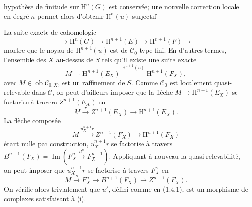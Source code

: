 \documentclass[11pt]{article}
\newcommand{\RRR}{\mathrm{RRR}}
\providecommand{\cC}{\mathcal C}
\providecommand{\Coker}{\operatorname{Coker}}
\providecommand{\Ker}{\operatorname{Ker}}
\providecommand{\cO}{\mathcal O}
\begin{document}
\providecommand{\cS}{\mathcal S}
\providecommand{\cD}{\mathcal D}
\providecommand{\cE}{\mathscr E}
\providecommand{\cG}{\mathscr G}
\providecommand{\cL}{\mathscr L}
\providecommand{\cM}{\mathscr M}
\providecommand{\cP}{\mathscr P}
\providecommand{\cK}{\mathcal K}
\providecommand{\Db}{\mathrm D}
\providecommand{\Kb}{\mathrm K}
\providecommand{\Trc}{\operatorname{Tr}}
\providecommand{\ob}{\operatorname{ob}}
\providecommand{\Coh}{\operatorname{Coh}}
\providecommand{\Cone}{\operatorname{Cone}}
\providecommand{\im}{\operatorname{Im}}
\providecommand{\Id}{\operatorname{Id}}
\providecommand{\RR}{\mathrm{R.R.}}
\providecommand{\RRR}{\mathrm{R.R.R.}}
\providecommand{\GrR}{\mathrm{G}}
\providecommand{\pr}{\operatorname{pr}}
\providecommand{\cC}{\mathcal C}
\providecommand{\cD}{\mathcal D}
\providecommand{\cK}{\mathcal K}
\providecommand{\cO}{\mathcal O}
\providecommand{\cS}{\mathcal S}
\providecommand{\Cpx}{\mathrm C}
\providecommand{\Kpx}{\mathrm K}
\providecommand{\Dpx}{\mathrm D}
\providecommand{\D}{\mathrm D}
\providecommand{\Ho}{\mathrm H}
\providecommand{\RHom}{\mathrm R\!\operatorname{Hom}}
\providecommand{\Ob}{\operatorname{ob}}
\providecommand{\Coker}{\operatorname{Coker}}
\providecommand{\Ker}{\operatorname{Ker}}
\providecommand{\Im}{\operatorname{Im}}
\providecommand{\Hom}{\operatorname{Hom}}
\providecommand{\Cone}{\operatorname{Cone}}
\providecommand{\id}{\operatorname{Id}}
\providecommand{\qis}{\xrightarrow{\sim}}
hypothèse de finitude sur \(\Ho^n(G)\) est conservée; une nouvelle correction locale en degré \(n\) permet alors d'obtenir \(\Ho^n(u)\) surjectif.

La suite exacte de cohomologie
\[
  \longrightarrow \Ho^n(G)\longrightarrow
  \Ho^{n+1}(E)\longrightarrow
  \Ho^{n+1}(F)\longrightarrow
\]
montre que le noyau de \(\Ho^{n+1}(u)\) est de \(\mathcal C_0\)-type fini. En d'autres termes, l'ensemble des \(X\) au-dessus de \(S\) tels qu'il existe une suite exacte
\[
  M\longrightarrow \Ho^{n+1}(E_X)
  \xrightarrow{\Ho^{n+1}(u)}
  \Ho^{n+1}(F_X),
\]
avec \(M\in\Ob\mathcal C_{0,X}\), est un raffinement de \(S\). Comme \(\mathcal C_0\) est localement quasi-relevable dans \(\mathcal C\), on peut d'ailleurs imposer que la flèche \(M\longrightarrow \Ho^{n+1}(E_X)\) se factorise à travers \(Z^{n+1}(E_X)\) en
\[
  M\xrightarrow{r}Z^{n+1}(E_X)\longrightarrow \Ho^{n+1}(E_X).
\]
La flèche composée
\[
  M\xrightarrow{u_X^{n+1}r}Z^{n+1}(F_X)\longrightarrow \Ho^{n+1}(F_X)
\]
étant nulle par construction, \(u_X^{n+1}r\) se factorise à travers \(B^{n+1}(F_X)=\Im\!\left(F_X^n\xrightarrow{d^n}F_X^{n+1}\right)\). Appliquant à nouveau la quasi-relevabilité, on peut imposer que \(u_X^{n+1}r\) se factorise à travers \(F_X^n\) en
\[
  M\xrightarrow{s}F_X^n\longrightarrow B^{n+1}(F_X)\longrightarrow Z^{n+1}(F_X).
\]
On vérifie alors trivialement que \(u'\), défini comme en (1.4.1), est un morphisme de complexes satisfaisant à (i).
\end{document}
